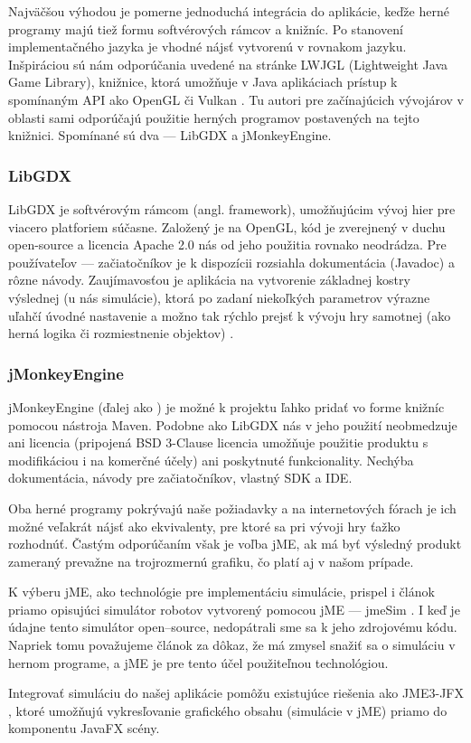 Najväčšou výhodou je pomerne jednoduchá integrácia do aplikácie, keďže herné programy majú tiež formu softvérových rámcov a knižníc. Po stanovení implementačného jazyka je vhodné nájsť  vytvorenú v rovnakom jazyku. Inšpiráciou sú nám odporúčania uvedené na stránke LWJGL (Lightweight Java Game Library), knižnice, ktorá umožňuje v Java aplikáciach prístup k spomínaným API ako OpenGL či Vulkan \cite{LWJGL}. Tu autori pre začínajúcich vývojárov v oblasti sami odporúčajú použitie herných programov postavených na tejto knižnici. Spomínané sú dva --- LibGDX a jMonkeyEngine.

\subsubsection{LibGDX}
LibGDX je softvérovým rámcom (angl. framework), umožňujúcim vývoj hier pre viacero platforiem súčasne. Založený je na OpenGL, kód je zverejnený v duchu open-source a licencia Apache 2.0 nás od jeho použitia rovnako neodrádza. Pre používateľov --- začiatočníkov je k dispozícii rozsiahla dokumentácia (Javadoc) a rôzne návody. Zaujímavosťou je aplikácia na vytvorenie základnej kostry výslednej  (u nás simulácie), ktorá po zadaní niekoľkých parametrov výrazne uľahčí úvodné nastavenie a možno tak rýchlo prejsť k vývoju hry samotnej (ako herná logika či rozmiestnenie objektov) \cite{LibGDXProjectGenerator}.

\subsubsection{jMonkeyEngine}
jMonkeyEngine (ďalej ako ) je možné k projektu ľahko pridať vo forme knižníc pomocou nástroja Maven. Podobne ako LibGDX nás v jeho použití neobmedzuje ani licencia (pripojená BSD 3-Clause licencia umožňuje použitie produktu s modifikáciou i na komerčné účely) ani poskytnuté funkcionality. Nechýba dokumentácia, návody pre začiatočníkov, vlastný SDK a IDE.

Oba herné programy pokrývajú naše požiadavky a na internetových fórach je ich možné veľakrát nájsť ako ekvivalenty, pre ktoré sa pri vývoji hry ťažko rozhodnúť. Častým odporúčaním však je voľba jME, ak má byť výsledný produkt zameraný prevažne na trojrozmernú grafiku, čo platí aj v našom prípade.

K výberu jME, ako technológie pre implementáciu simulácie, prispel i článok priamo opisujúci simulátor robotov vytvorený pomocou jME --- jmeSim \cite{jmeSim}. I keď je údajne tento simulátor open--source, nedopátrali sme sa k jeho zdrojovému kódu. Napriek tomu považujeme článok za dôkaz, že má zmysel snažiť sa o simuláciu v hernom programe, a jME je pre tento účel použiteľnou technológiou.

Integrovať simuláciu do našej aplikácie pomôžu existujúce riešenia ako JME3-JFX \cite{jmejfx}, ktoré umožňujú vykresľovanie grafického obsahu (simulácie v jME) priamo do komponentu JavaFX scény.
